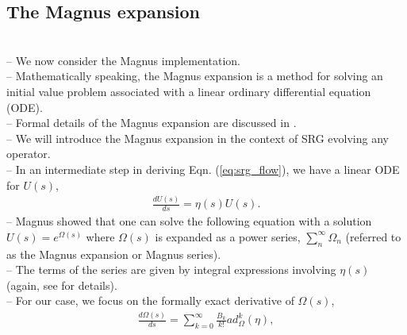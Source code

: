 \documentclass[preprintnumbers,floatfix,aps,prc,preprint,nofootinbib]{revtex4-1}
\begin{document}
\subsection{The Magnus expansion}
\label{sec:magnus_expansion}

\\
-- We now consider the Magnus implementation.
\\
-- Mathematically speaking, the Magnus expansion is a method for solving an initial value problem associated with a linear ordinary differential equation (ODE).
\\
-- Formal details of the Magnus expansion are discussed in \cite{Blanes:2009ab}.
\\
-- We will introduce the Magnus expansion in the context of SRG evolving any operator.
\\
-- In an intermediate step in deriving Eqn. (\ref{eq:srg_flow}), we have a linear ODE for $U(s)$,
%
\begin{eqnarray}
	\label{eq:unitary_trans}
	\frac{dU(s)}{ds} = \eta(s) U(s).
\end{eqnarray}
%
-- Magnus showed that one can solve the following equation with a solution $U(s)=e^{\Omega(s)}$ where $\Omega(s)$ is expanded as a power series, $\sum_{n}^{\infty} \Omega_n$ (referred to as the Magnus expansion or Magnus series).
\\
-- The terms of the series are given by integral expressions involving $\eta(s)$ (again, see \cite{Blanes:2009ab, Magnus:1954zz} for details).
\\
-- For our case, we focus on the formally exact derivative of $\Omega(s)$,
%
\begin{eqnarray}
	\label{eq:magnus_omega}
	\frac{d\Omega(s)}{ds} = \sum_{k=0}^{\infty} \frac{B_k}{k!} ad_{\Omega}^{k}(\eta),
\end{eqnarray}
\end{document}

